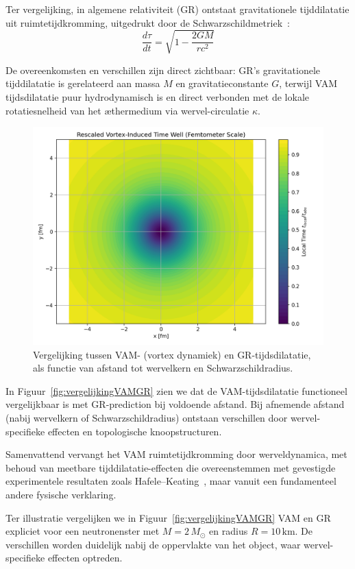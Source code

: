 Ter vergelijking, in algemene relativiteit (GR) ontstaat gravitationele tijddilatatie uit ruimtetijdkromming, uitgedrukt door de Schwarzschildmetriek~\cite{schutz2009first}:
\begin{equation}\label{eq:GRtijd}
    \frac{d\tau}{dt} = \sqrt{1 - \frac{2GM}{rc^2}}
\end{equation}

De overeenkomsten en verschillen zijn direct zichtbaar: GR's gravitationele tijddilatatie is gerelateerd aan massa $M$ en gravitatieconstante $G$, terwijl VAM tijdsdilatatie puur hydrodynamisch is en direct verbonden met de lokale rotatiesnelheid van het æthermedium via wervel-circulatie $\kappa$.

\begin{figure}[ht!]
    \centering
    \includegraphics[width=0.7\linewidth]{RadialProfileOfLocalTimeDilation_Vortex-Induced_Time_Well}
    \caption{Vergelijking tussen VAM- (vortex dynamiek) en GR-tijdsdilatatie, als functie van afstand tot wervelkern en Schwarzschildradius.}
    \label{fig:vergelijking_VAMGR}
\end{figure}

In Figuur~\ref{fig:vergelijkingVAMGR} zien we dat de VAM-tijdsdilatatie functioneel vergelijkbaar is met GR-prediction bij voldoende afstand. Bij afnemende afstand (nabij wervelkern of Schwarzschildradius) ontstaan verschillen door wervel-specifieke effecten en topologische knoopstructuren.

Samenvattend vervangt het VAM ruimtetijdkromming door werveldynamica, met behoud van meetbare tijddilatatie-effecten die overeenstemmen met gevestigde experimentele resultaten zoals Hafele–Keating~\cite{hafele1972around}, maar vanuit een fundamenteel andere fysische verklaring.


Ter illustratie vergelijken we in Figuur~\ref{fig:vergelijkingVAMGR} VAM en GR expliciet voor een neutronenster met $M = 2\,M_\odot$ en radius $R = 10\,\text{km}$. De verschillen worden duidelijk nabij de oppervlakte van het object, waar wervel-specifieke effecten optreden.

